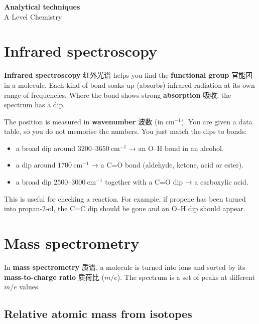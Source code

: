 \documentclass[11pt]{article}
\begin{document}
\begin{center}
  {\LARGE\bfseries Analytical techniques}\\[0.35em]
  {\large A Level Chemistry}
\end{center}
\vspace{0.6em}

\section*{Infrared spectroscopy}

\textbf{Infrared spectroscopy} 红外光谱 helps you find the \textbf{functional group} 官能团 in a molecule. Each kind of bond soaks up (absorbs) infrared radiation at its own range of frequencies. Where the bond shows strong \textbf{absorption} 吸收, the spectrum has a dip.

The position is measured in \textbf{wavenumber} 波数 (in $\text{cm}^{-1}$). You are given a data table, so you do not memorise the numbers. You just match the dips to bonds:

\begin{itemize}
\item a broad dip around $3200$–$3650\ \text{cm}^{-1}$ → an O–H bond in an alcohol.

\item a dip around $1700\ \text{cm}^{-1}$ → a C=O bond (aldehyde, ketone, acid or ester).

\item a broad dip $2500$–$3000\ \text{cm}^{-1}$ together with a C=O dip → a carboxylic acid.

\end{itemize}

This is useful for checking a reaction. For example, if propene has been turned into propan-2-ol, the C=C dip should be gone and an O–H dip should appear.

\section*{Mass spectrometry}

In \textbf{mass spectrometry} 质谱, a molecule is turned into ions and sorted by its \textbf{mass-to-charge ratio} 质荷比 ($m/e$). The spectrum is a set of peaks at different $m/e$ values.

\subsection*{Relative atomic mass from isotopes}
\end{document}
